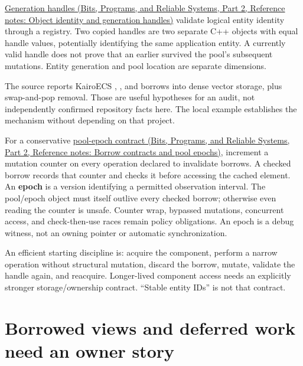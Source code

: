 \href{../01-Bits-Programs-and-Reliable-Systems-P02/main.pdf\#appendix-f1581457d322}{Generation handles (Bits, Programs, and Reliable Systems, Part 2, Reference notes: Object identity and generation handles)} validate logical entity identity through a registry. Two copied handles are two separate C++ objects with equal handle values, potentially identifying the same application entity. A currently valid handle does not prove that an earlier  survived the pool's subsequent mutations. Entity generation and pool location are separate dimensions.

The source reports KairoECS , , and  borrows into dense vector storage, plus swap-and-pop removal. Those are useful hypotheses for an audit, not independently confirmed repository facts here. The local  example establishes the mechanism without depending on that project.

For a conservative \href{../01-Bits-Programs-and-Reliable-Systems-P02/main.pdf\#appendix-aa405b7c3903}{pool-epoch contract (Bits, Programs, and Reliable Systems, Part 2, Reference notes: Borrow contracts and pool epochs)}, increment a mutation counter on every operation declared to invalidate borrows. A checked borrow records that counter and checks it before accessing the cached element. An \textbf{epoch} is a version identifying a permitted observation interval. The pool/epoch object must itself outlive every checked borrow; otherwise even reading the counter is unsafe. Counter wrap, bypassed mutations, concurrent access, and check-then-use races remain policy obligations. An epoch is a debug witness, not an owning pointer or automatic synchronization.

An efficient starting discipline is: acquire the component, perform a narrow operation without structural mutation, discard the borrow, mutate, validate the handle again, and reacquire. Longer-lived component access needs an explicitly stronger storage/ownership contract. ``Stable entity IDs'' is not that contract.

\section{Borrowed views and deferred work need an owner story}\label{05-engine-i-ch003-borrowed-views-and-deferred-work-need-an-owner-story}

